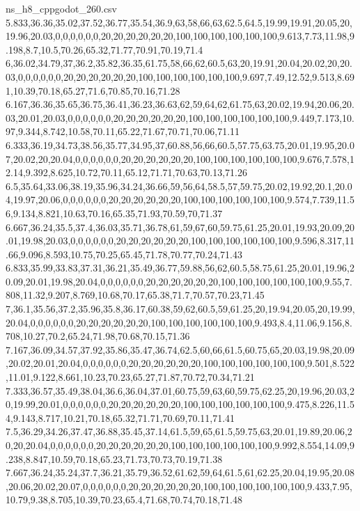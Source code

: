 \begin{filecontents*}[overwrite]{ns_h8_cppgodot_260.csv}
5.833,36.36,35.02,37.52,36.77,35.54,36.9,63,58,66,63,62.5,64.5,19.99,19.91,20.05,20,19.96,20.03,0,0,0,0,0,0,20,20,20,20,20,20,100,100,100,100,100,100,9.613,7.73,11.98,9.198,8.7,10.5,70.26,65.32,71.77,70.91,70.19,71.4
6,36.02,34.79,37,36.2,35.82,36.35,61.75,58,66,62,60.5,63,20,19.91,20.04,20.02,20,20.03,0,0,0,0,0,0,20,20,20,20,20,20,100,100,100,100,100,100,9.697,7.49,12.52,9.513,8.691,10.39,70.18,65.27,71.6,70.85,70.16,71.28
6.167,36.36,35.65,36.75,36.41,36.23,36.63,62,59,64,62,61.75,63,20.02,19.94,20.06,20.03,20.01,20.03,0,0,0,0,0,0,20,20,20,20,20,20,100,100,100,100,100,100,9.449,7.173,10.97,9.344,8.742,10.58,70.11,65.22,71.67,70.71,70.06,71.11
6.333,36.19,34.73,38.56,35.77,34.95,37,60.88,56,66,60.5,57.75,63.75,20.01,19.95,20.07,20.02,20,20.04,0,0,0,0,0,0,20,20,20,20,20,20,100,100,100,100,100,100,9.676,7.578,12.14,9.392,8.625,10.72,70.11,65.12,71.71,70.63,70.13,71.26
6.5,35.64,33.06,38.19,35.96,34.24,36.66,59,56,64,58.5,57,59.75,20.02,19.92,20.1,20.04,19.97,20.06,0,0,0,0,0,0,20,20,20,20,20,20,100,100,100,100,100,100,9.574,7.739,11.56,9.134,8.821,10.63,70.16,65.35,71.93,70.59,70,71.37
6.667,36.24,35.5,37.4,36.03,35.71,36.78,61,59,67,60,59.75,61.25,20.01,19.93,20.09,20.01,19.98,20.03,0,0,0,0,0,0,20,20,20,20,20,20,100,100,100,100,100,100,9.596,8.317,11.66,9.096,8.593,10.75,70.25,65.45,71.78,70.77,70.24,71.43
6.833,35.99,33.83,37.31,36.21,35.49,36.77,59.88,56,62,60.5,58.75,61.25,20.01,19.96,20.09,20.01,19.98,20.04,0,0,0,0,0,0,20,20,20,20,20,20,100,100,100,100,100,100,9.55,7.808,11.32,9.207,8.769,10.68,70.17,65.38,71.7,70.57,70.23,71.45
7,36.1,35.56,37.2,35.96,35.8,36.17,60.38,59,62,60.5,59,61.25,20,19.94,20.05,20,19.99,20.04,0,0,0,0,0,0,20,20,20,20,20,20,100,100,100,100,100,100,9.493,8.4,11.06,9.156,8.708,10.27,70.2,65.24,71.98,70.68,70.15,71.36
7.167,36.09,34.57,37.92,35.86,35.47,36.74,62.5,60,66,61.5,60.75,65,20.03,19.98,20.09,20.02,20.01,20.04,0,0,0,0,0,0,20,20,20,20,20,20,100,100,100,100,100,100,9.501,8.522,11.01,9.122,8.661,10.23,70.23,65.27,71.87,70.72,70.34,71.21
7.333,36.57,35.49,38.04,36.6,36.04,37.01,60.75,59,63,60,59.75,62.25,20,19.96,20.03,20,19.99,20.01,0,0,0,0,0,0,20,20,20,20,20,20,100,100,100,100,100,100,9.475,8.226,11.54,9.143,8.717,10.21,70.18,65.32,71.71,70.69,70.11,71.41
7.5,36.29,34.26,37.47,36.88,35.45,37.14,61.5,59,65,61.5,59.75,63,20.01,19.89,20.06,20,20,20.04,0,0,0,0,0,0,20,20,20,20,20,20,100,100,100,100,100,100,9.992,8.554,14.09,9.238,8.847,10.59,70.18,65.23,71.73,70.73,70.19,71.38
7.667,36.24,35.24,37.7,36.21,35.79,36.52,61.62,59,64,61.5,61,62.25,20.04,19.95,20.08,20.06,20.02,20.07,0,0,0,0,0,0,20,20,20,20,20,20,100,100,100,100,100,100,9.433,7.95,10.79,9.38,8.705,10.39,70.23,65.4,71.68,70.74,70.18,71.48

\end{filecontents*}
